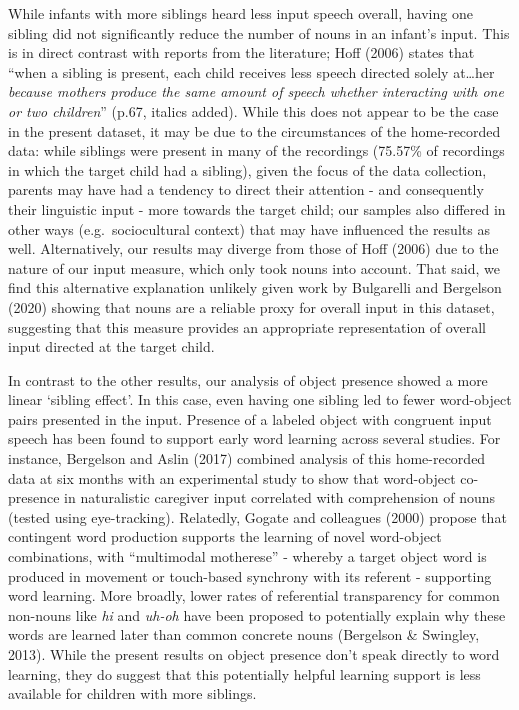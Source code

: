 \documentclass[
  man,mask,floatsintext]{apa6}
\begin{document}
While infants with more siblings heard less input speech overall, having one sibling did not significantly reduce the number of nouns in an infant's input. This is in direct contrast with reports from the literature; Hoff (2006) states that ``when a sibling is present, each child receives less speech directed solely at\ldots her \emph{because mothers produce the same amount of speech whether interacting with one or two children}'' (p.67, italics added). While this does not appear to be the case in the present dataset, it may be due to the circumstances of the home-recorded data: while siblings were present in many of the recordings (75.57\% of recordings in which the target child had a sibling), given the focus of the data collection, parents may have had a tendency to direct their attention - and consequently their linguistic input - more towards the target child; our samples also differed in other ways (e.g.~sociocultural context) that may have influenced the results as well. Alternatively, our results may diverge from those of Hoff (2006) due to the nature of our input measure, which only took nouns into account. That said, we find this alternative explanation unlikely given work by Bulgarelli and Bergelson (2020) showing that nouns are a reliable proxy for overall input in this dataset, suggesting that this measure provides an appropriate representation of overall input directed at the target child.

In contrast to the other results, our analysis of object presence showed a more linear `sibling effect'. In this case, even having one sibling led to fewer word-object pairs presented in the input. Presence of a labeled object with congruent input speech has been found to support early word learning across several studies. For instance, Bergelson and Aslin (2017) combined analysis of this home-recorded data at six months with an experimental study to show that word-object co-presence in naturalistic caregiver input correlated with comprehension of nouns (tested using eye-tracking). Relatedly, Gogate and colleagues (2000) propose that contingent word production supports the learning of novel word-object combinations, with ``multimodal motherese'' - whereby a target object word is produced in movement or touch-based synchrony with its referent - supporting word learning. More broadly, lower rates of referential transparency for common non-nouns like \emph{hi} and \emph{uh-oh} have been proposed to potentially explain why these words are learned later than common concrete nouns (Bergelson \& Swingley, 2013). While the present results on object presence don't speak directly to word learning, they do suggest that this potentially helpful learning support is less available for children with more siblings.
\end{document}
